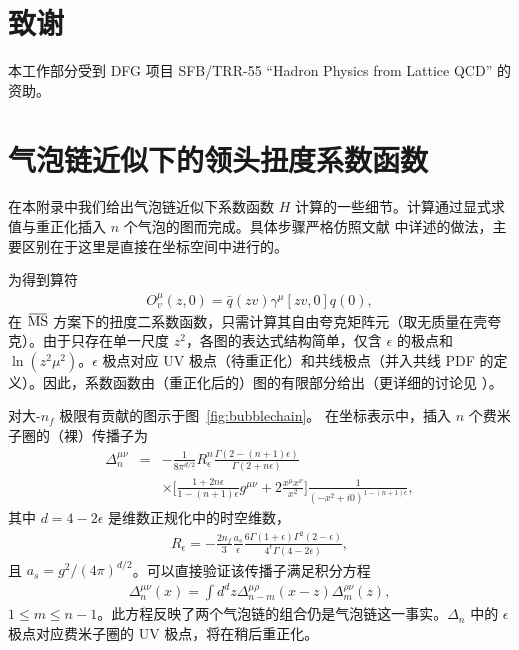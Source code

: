 \section*{致谢}

本工作部分受到 DFG 项目 SFB/TRR-55 ``Hadron Physics from Lattice QCD'' 的资助。



\appendix


%
\section{气泡链近似下的领头扭度系数函数}
\label{App:H}
%

在本附录中我们给出气泡链近似下系数函数 $H$ 计算的一些细节。计算通过显式求值与重正化插入 $n$ 个气泡的图而完成。具体步骤严格仿照文献 \cite{Beneke:1995pq,Scimemi:2016ffw} 中详述的做法，主要区别在于这里是直接在坐标空间中进行的。

为得到算符
\begin{eqnarray}
O_v^\mu(z,0)=\bar q(z v)\gamma^\mu [zv,0]q(0),
\end{eqnarray}
在 $\MSbar$ 方案下的扭度二系数函数，只需计算其自由夸克矩阵元（取无质量在壳夸克）。由于只存在单一尺度 $z^2$，各图的表达式结构简单，仅含 $\epsilon$ 的极点和 $\ln(z^2\mu^2)$。$\epsilon$ 极点对应 UV 极点（待重正化）和共线极点（并入共线 PDF 的定义）。因此，系数函数由（重正化后的）图的有限部分给出（更详细的讨论见 \cite{Echevarria:2016scs,Scimemi:2016ffw}）。

对大-$n_f$ 极限有贡献的图示于图~\ref{fig:bubblechain}。
在坐标表示中，插入 $n$ 个费米子圈的（裸）传播子为
\begin{eqnarray}
\Delta_n^{\mu\nu}&=&-\frac{1}{8\pi^{d/2}}R_\epsilon^n\frac{\Gamma(2-(n+1)\epsilon)}{\Gamma(2+n\epsilon)}
\\\nonumber &&
\times\Big[\frac{1+2n\epsilon}{1-(n+1)\epsilon}g^{\mu\nu}+2\frac{x^\mu x^\nu}{x^2}\Big]\frac{1}{(-x^2+i0)^{1-(n+1)\epsilon}},
\end{eqnarray}
其中 $d=4-2\epsilon$ 是维数正规化中的时空维数，
\begin{eqnarray}
R_\epsilon=-\frac{2n_f}{3}\frac{a_s}{\epsilon}\frac{6\Gamma(1+\epsilon)\Gamma^2(2-\epsilon)}{4^\epsilon\Gamma(4-2\epsilon)},
\end{eqnarray}
且 $a_s=g^2/(4\pi)^{d/2}$。可以直接验证该传播子满足积分方程
\begin{eqnarray}
\Delta_{n}^{\mu\nu}(x)=\int d^dz \Delta^{\mu\rho}_{n-m}(x-z)\Delta^{\rho\nu}_m(z),
\end{eqnarray}
$1\leqslant m \leqslant n-1$。此方程反映了两个气泡链的组合仍是气泡链这一事实。$\Delta_n$ 中的 $\epsilon$ 极点对应费米子圈的 UV 极点，将在稍后重正化。

